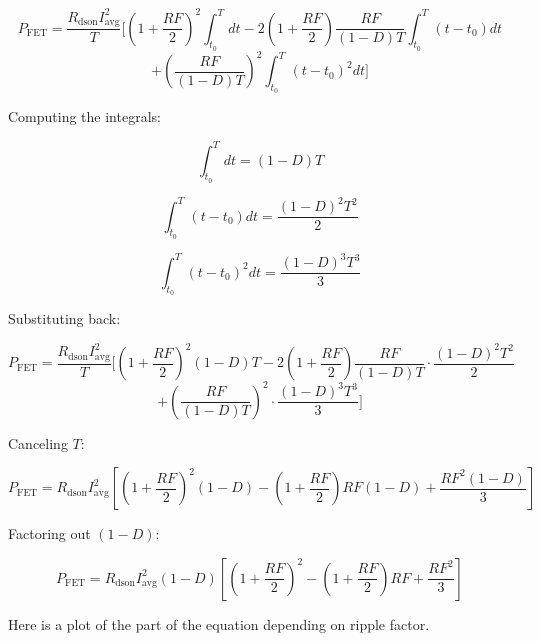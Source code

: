 \documentclass{article}
\begin{document}
\[
P_\text{FET} = \frac{R_\text{dson} I_\text{avg}^2}{T} \Bigg[
(1+\frac{RF}{2})^2 \int_{t_0}^{T} dt 
- 2(1+\frac{RF}{2}) \frac{RF}{(1-D)T} \int_{t_0}^{T} (t-t_0) dt 
\]
\[
+ \left( \frac{RF}{(1-D)T} \right)^2 \int_{t_0}^{T} (t-t_0)^2 dt 
\Bigg]
\]

Computing the integrals:

\[
\int_{t_0}^{T} dt = (1-D)T
\]

\[
\int_{t_0}^{T} (t-t_0) dt = \frac{(1-D)^2T^2}{2}
\]

\[
\int_{t_0}^{T} (t-t_0)^2 dt = \frac{(1-D)^3T^3}{3}
\]

Substituting back:


\[
P_\text{FET} = \frac{R_\text{dson} I_\text{avg}^2}{T} \Bigg[
(1+\frac{RF}{2})^2 (1-D)T 
- 2(1+\frac{RF}{2}) \frac{RF}{(1-D)T} \cdot \frac{(1-D)^2T^2}{2} 
\]
\[
+ \left(\frac{RF}{(1-D)T} \right)^2 \cdot \frac{(1-D)^3T^3}{3} 
\Bigg]
\]

Canceling \(T\):

\[
P_\text{FET} = R_\text{dson} I_\text{avg}^2 \left[ (1+\frac{RF}{2})^2 (1-D) - (1+\frac{RF}{2})RF (1-D) + \frac{RF^2 (1-D)}{3} \right]
\]

Factoring out \( (1-D) \):

\begin{equation}
P_\text{FET} = R_\text{dson} I_\text{avg}^2 (1-D) \left[ (1+\frac{RF}{2})^2 - (1+\frac{RF}{2})RF + \frac{RF^2}{3} \right]
\end{equation}

Here is a plot of the part of the equation depending on ripple factor.

\begin{center}
\end{center}
\end{document}
